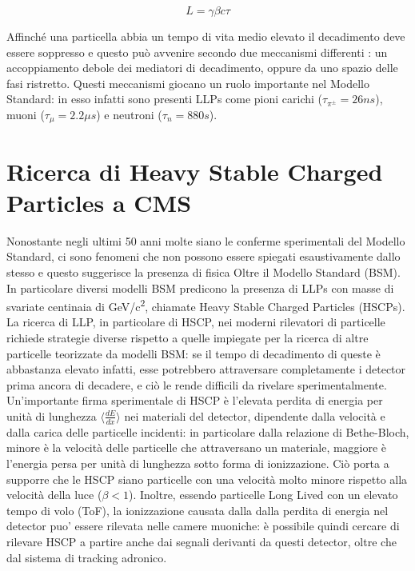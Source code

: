\begin{equation}
  \label{eq:LorentzBoost}
  L = \gamma \beta c \tau
\end{equation}


Affinché una particella abbia un tempo di vita medio elevato il decadimento deve essere soppresso e questo può avvenire secondo due meccanismi differenti \cite{Genest:2022}: un accoppiamento debole dei mediatori di decadimento, oppure da uno spazio delle fasi ristretto. \newline
Questi meccanismi giocano un ruolo importante nel Modello Standard: in esso infatti sono presenti LLPs come pioni carichi ($\tau_{\pi^\pm} = 26\si{ns}$), muoni ($\tau_{\mu} = 2.2 \si{\mu s}$) e neutroni ($\tau_{n} = 880\si{s}$).

\section{Ricerca di Heavy Stable Charged Particles a CMS}
\label{sec:NewPhysics}

Nonostante negli ultimi 50 anni molte siano le conferme sperimentali del Modello Standard, ci sono fenomeni che non possono essere spiegati esaustivamente dallo stesso e questo suggerisce la presenza di fisica Oltre il Modello Standard (BSM).\newline
In particolare diversi modelli BSM predicono la presenza di LLPs con masse di svariate centinaia di \si{GeV/c^2}, chiamate Heavy Stable Charged Particles (HSCPs). La ricerca di LLP, in particolare di HSCP, nei moderni rilevatori di particelle richiede strategie diverse rispetto a quelle impiegate per la ricerca di altre particelle teorizzate da modelli BSM: se il tempo di decadimento di queste è abbastanza elevato infatti, esse potrebbero attraversare completamente i detector prima ancora di decadere, e ciò le rende difficili da rivelare sperimentalmente. \newline 
Un'importante firma sperimentale di HSCP è l'elevata perdita di energia per unità di lunghezza $\langle \frac{dE}{dx}\rangle$ nei materiali del detector, dipendente dalla velocità e dalla carica delle particelle incidenti: in particolare dalla relazione di Bethe-Bloch, minore è la velocità delle particelle che attraversano un materiale, maggiore è l'energia persa per unità di lunghezza sotto forma di ionizzazione. Ciò porta a supporre che le HSCP siano particelle con una velocità molto minore rispetto alla velocità della luce ($\beta < 1$). Inoltre, essendo particelle Long Lived con un elevato tempo di volo (ToF), la ionizzazione causata dalla dalla perdita di energia nel detector puo' essere rilevata nelle camere muoniche: è possibile quindi cercare di rilevare HSCP a partire anche dai segnali derivanti da questi detector, oltre che dal sistema di tracking adronico.


